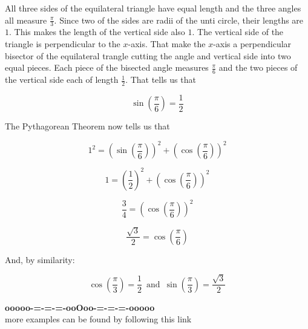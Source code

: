 \documentclass{ximera}
\begin{document}
All three sides of the equilateral triangle have equal length and the three angles all measure $\frac{\pi}{3}$.  Since two of the sides are radii of the unti circle, their lengths are $1$.  This makes the length  of the vertical side also $1$.  The vertical side of the triangle is perpendicular to the $x$-axis.  That make the $x$-axis a perpendicular bisector of the equilateral trangle cutting the angle and vertical side into two equal pieces. Each piece of the bisected angle measures $\frac{\pi}{6}$ and the two pieces of the vertical side each of length $\frac{1}{2}$. That tells us that 

\[  \sin\left( \frac{\pi}{6} \right) = \frac{1}{2} \]


The Pythagorean Theorem now tells us that 

\[  1^2 = \left( \sin\left( \frac{\pi}{6} \right) \right)^2 + \left( \cos\left( \frac{\pi}{6} \right) \right)^2  \]


\[  1 = \left( \frac{1}{2} \right)^2 + \left( \cos\left( \frac{\pi}{6} \right) \right)^2  \]


\[  \frac{3}{4} = \left( \cos\left( \frac{\pi}{6} \right) \right)^2  \]



\[  \frac{\sqrt{3}}{2} = \cos\left( \frac{\pi}{6} \right)   \]



And, by similarity:


\[  \cos\left( \frac{\pi}{3} \right) = \frac{1}{2}   \, \text{ and } \,   \sin\left( \frac{\pi}{3} \right)  = \frac{\sqrt{3}}{2} \]  









\begin{onlineOnly}
\begin{center}
\textbf{\textcolor{green!50!black}{ooooo-=-=-=-ooOoo-=-=-=-ooooo}} \\

more examples can be found by following this link\\ 

\end{center}
\end{onlineOnly}
\end{document}
